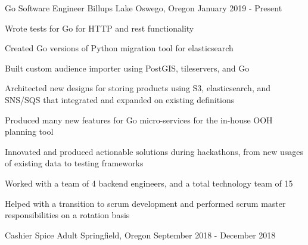 

\begin{cventries}

\cventry
{Go Software Engineer} %
{Billups} %
{Lake Oswego, Oregon} %
{January 2019 - Present} %
{
  \begin{cvitems} %
    \item {Wrote tests for Go for HTTP and rest functionality}
    \item {Created Go versions of Python migration tool for elasticsearch}
    \item {Built custom audience importer using PostGIS, tileservers, and Go}
    \item {Architected new designs for storing products using S3, elasticsearch, and SNS/SQS that integrated and expanded on existing definitions}
    \item {Produced many new features for Go micro-services for the in-house OOH planning tool}
    \item {Innovated and produced actionable solutions during hackathons, from new usages of existing data to testing frameworks}
    \item {Worked with a team of 4 backend engineers, and a total technology team of 15}
    \item {Helped with a transition to scrum development and performed scrum master responsibilities on a rotation basis}
  \end{cvitems}
}

\cventry
{Cashier} %
{Spice Adult} %
{Springfield, Oregon} %
{September 2018 - December 2018} %
{
}


\end{cventries}
